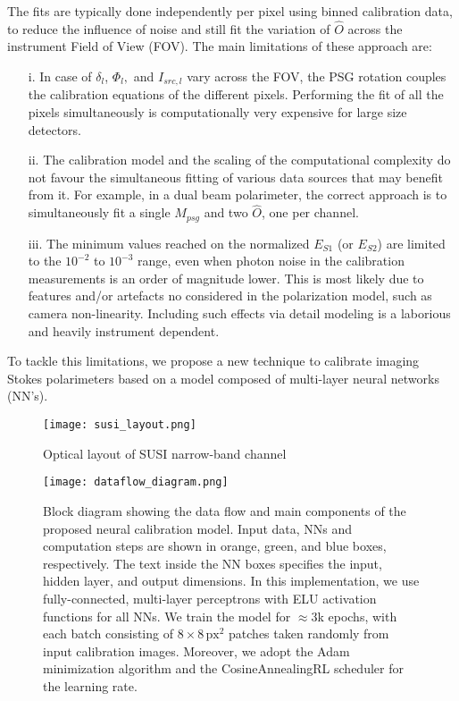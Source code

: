 \documentclass[baaa]{baaa}
\begin{document}
The fits are typically done independently per pixel using binned calibration data, to reduce the influence of noise and still fit the variation of $\hat{O}$ across the instrument Field of View (FOV). The main limitations of these approach are:

\begin{itemize}
    \item[i.] In case of $\delta_l$, $\Phi_l,$ and $I_{src,l}$ vary across the FOV, the PSG rotation couples the calibration equations of the different pixels. Performing the fit of all the pixels simultaneously is computationally very expensive for large size detectors. \\
    \item[ii.] The calibration model and the scaling of the computational complexity do not favour the simultaneous fitting of various data sources that may benefit from it. For example, in a dual beam polarimeter, the correct approach is to simultaneously fit a single $M_{psg}$ and two $\hat{O}$, one per channel. \\
    \item[iii.] The minimum values reached on the normalized $E_{S1}$ (or $E_{S2}$) are limited to the $10^{-2}$ to $10^{-3}$ range, even when photon noise in the calibration measurements is an order of magnitude lower. This is most likely due to features and/or artefacts no considered in the polarization model, such as camera non-linearity. Including such effects via detail modeling is a laborious and heavily instrument dependent.\\
\end{itemize}

To tackle this limitations, we propose a new technique to calibrate imaging Stokes polarimeters based on a model composed of multi-layer neural networks (NN's).

\begin{figure}[!t]
    \centering
    \texttt{[image: susi\_layout.png]}
    \caption{Optical layout of SUSI narrow-band channel}
    \label{fig:susi_layout}
\end{figure}

\begin{figure*}[!ht]
    \centering
    \texttt{[image: dataflow\_diagram.png]}
    \caption{Block diagram showing the data flow and main components of the proposed neural calibration model. Input data, NNs and computation steps are shown in orange, green, and blue boxes, respectively. The text inside the NN boxes specifies the input, hidden layer, and output dimensions. In this implementation, we use fully-connected, multi-layer perceptrons with ELU activation functions for all NNs. We train the model for $\approx$3k epochs, with each batch consisting of $8\times8\,\text{px}^2$ patches taken randomly from input calibration images. Moreover, we adopt the Adam minimization algorithm and the CosineAnnealingRL scheduler for the learning rate.}
    \label{fig:dataflow_diagram}
\end{figure*}
\end{document}
